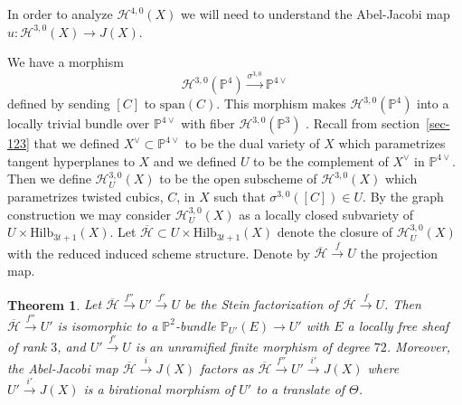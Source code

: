 \documentclass[twoside,12pt,reqno]{amsart}
\theoremstyle{plain}
\newtheorem{thm}{Theorem}[section]
\theoremstyle{definition}
\newcommand{\Hdg}[2]{\mathcal{H}^{#1,#2}}
\newcommand{\PP}{\mathbb{P}}
\newcommand{\HI}[2]{\text{Hilb}_{#1}(#2)}
\def\ps{\vspace{4pt}}
\renewcommand{\xrightarrow}[1]{\mathbin{\stackrel{#1}{\longrightarrow}}}
\begin{document}
In order to analyze $\Hdg{4}{0}(X)$ we will need to understand the
Abel-Jacobi map $u:\Hdg{3}{0}(X)\rightarrow J(X)$.

\ps

We have a morphism 
\begin{equation}
\Hdg{3}{0}(\PP^4)\xrightarrow{\sigma^{3,0}} \PP^{4\vee}
\end{equation}
defined by sending $[C]$ to $\text{span}(C)$.
This morphism makes $\Hdg{3}{0}(\PP^4)$ 
into a locally trivial bundle over $\PP^{4\vee}$ with fiber
$\Hdg{3}{0}(\PP^3)$ .  Recall from section~\ref{sec-123} that we defined
$X^\vee
\subset \PP^{4\vee}$ to be the dual variety of $X$ which parametrizes
tangent hyperplanes to $X$ and we defined $U$ to
be the complement of $X^\vee$ in $\PP^{4\vee}$.  Then we define 
$\Hdg{3}{0}_{U}(X)$ to be the
open subscheme of $\Hdg{3}{0}(X)$ which parametrizes twisted cubics,
$C$, in $X$ 
such that $\sigma^{3,0}([C])\in U$.  By the graph construction we may
consider $\Hdg{3}{0}_{U}(X)$ as a locally closed subvariety of
$U\times \HI{3t+1}{X}$.  
Let $\overline{\mathcal{H}}\subset U\times\HI{3t+1}{X}$ denote the
closure of $\Hdg{3}{0}_{U}(X)$ with the reduced induced scheme structure.
Denote by $\overline{\mathcal{H}} \xrightarrow{f} U$ the projection map. 

\ps

\begin{thm}\label{thm-st30}  Let
$\overline{\mathcal{H}}\xrightarrow{f''} U'\xrightarrow{f'} U$ 
be the Stein factorization of $\overline{\mathcal{H}}\xrightarrow{f} U$.
Then 
$\overline{\mathcal{H}}\xrightarrow{f''} U'$ is isomorphic to a $\PP^2$-bundle
$\PP_{U'}(E)\xrightarrow{} U'$ with $E$ a locally free sheaf of rank $3$,
and $U'\xrightarrow{f'} U$ is an unramified finite morphism of degree
$72$.  Moreover, the Abel-Jacobi map $\overline{\mathcal{H}}\xrightarrow{i}
J(X)$ 
factors as $\overline{\mathcal{H}}\xrightarrow{f''} U'\xrightarrow{i'}
J(X)$ where 
$U'\xrightarrow{i'} J(X)$ is a birational morphism of $U'$ to a translate
of $\Theta$.
\end{thm} 
\end{document}
